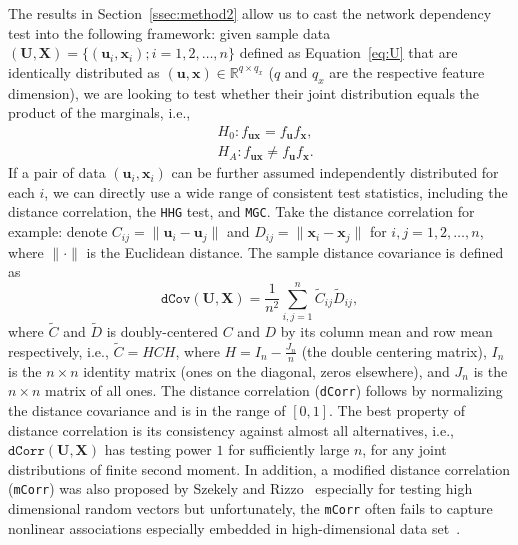 \documentclass[11pt]{article}
\theoremstyle{definition}
\begin{document}
The results in Section~\ref{ssec:method2} allow us to cast the network dependency test into the following framework: given sample data $(\mathbf{U}, \mathbf{X}) = \{  (\mathbf{u}_{i}, \mathbf{x}_{i} ) ; i = 1,2, \ldots, n \}$ defined as Equation~\ref{eq:U} that are identically distributed as $(\mathbf{u},\mathbf{x}) \in \mathbb{R}^{q \times q_x}$ ($q$ and $q_x$ are the respective feature dimension), we are looking to test whether their joint distribution equals the product of the marginals, i.e.,
\begin{align*}
& H_{0}: f_{\mathbf{u}\mathbf{x}}=f_{\mathbf{u}}f_{\mathbf{x}},\\
& H_{A}: f_{\mathbf{u}\mathbf{x}}\neq f_{\mathbf{u}}f_{\mathbf{x}}.
\end{align*}
If a pair of data $(\mathbf{u}_{i}, \mathbf{x}_{i} )$ can be further assumed independently distributed for each $i$, we can directly use a wide range of consistent test statistics, including the distance correlation, the \texttt{HHG} test, and \texttt{MGC}. Take the distance correlation for example: denote $C_{ij} = \parallel \mathbf{u}_{i} - \mathbf{u}_{j} \parallel$ and $D_{ij} = \parallel \mathbf{x}_{i} - \mathbf{x}_{j} \parallel$ for $i,j=1,2, \ldots ,n$, where $\parallel \cdot \parallel$ is the Euclidean distance. The sample distance covariance is defined as 
\begin{equation}	 
\label{eq:dCov}
\texttt{dCov}(\mathbf{U}, \mathbf{X}) = \frac{1}{n^2} \sum\limits_{i,j=1}^{n} \tilde{C}_{ij} \tilde{D}_{ij},
\end{equation}
where $\tilde{C}$ and $\tilde{D}$ is doubly-centered $C$ and $D$ by its column mean and row mean respectively, i.e., $\tilde{C}=HCH$, where $H=I_{n}-\frac{J_{n}}{n}$ (the double centering matrix), $I_n$ is the $n \times n$ identity matrix (ones on the diagonal, zeros elsewhere), and $J_n$ is the $n \times n$ matrix of all ones. The distance correlation (\texttt{dCorr}) follows by normalizing the distance covariance and is in the range of $[0,1]$. The best property of distance correlation is its consistency against almost all alternatives, i.e., $\texttt{dCorr}(\mathbf{U}, \mathbf{X})$ has testing power $1$ for sufficiently large $n$, for any joint distributions of finite second moment. In addition, a modified distance correlation (\texttt{mCorr}) was also proposed by Szekely and Rizzo~\cite{szekely2013distance} especially for testing high dimensional random vectors but unfortunately, the \texttt{mCorr} often fails to capture nonlinear associations especially embedded in high-dimensional data set~\citep{shen2016discovering, heller2012consistent}. 
\end{document}
